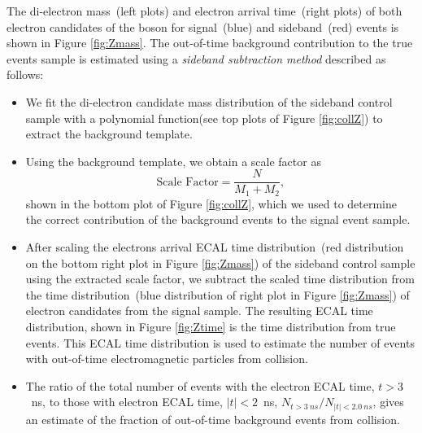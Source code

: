 \vspace{5mm}
The di-electron mass~(left plots) and electron arrival time~(right plots) of both electron candidates of the \PZ boson for signal~(blue) and sideband~(red) events is shown in Figure \ref{fig:Zmass}. The out-of-time background contribution to the true \PZ events sample is estimated using a \textit{sideband subtraction method} described as follows:
\begin{itemize}
\item We fit the di-electron candidate mass distribution of the sideband control sample with a polynomial function(see top plots of Figure  \ref{fig:collZ}) to extract the background template.
\item Using the background template, we obtain a scale factor as 
\begin{equation}
\mbox{Scale Factor} = \frac{N}{M_{1} + M_{2}},
\end{equation}
shown in the bottom plot of Figure \ref{fig:collZ}, which we used to determine the correct contribution of the background events to the signal event sample.
\item After scaling the electrons arrival ECAL time distribution~(red distribution on the bottom right plot in Figure \ref{fig:Zmass}) of the sideband control sample using the extracted scale factor, we subtract the scaled time distribution from the time distribution~(blue distribution of right plot in Figure \ref{fig:Zmass}) of \PZ electron candidates from the signal sample. The resulting ECAL time distribution, shown in Figure \ref{fig:Ztime} is the time distribution from true \PZ events. This ECAL time distribution is used to estimate the number of events with out-of-time electromagnetic particles from collision.
\item The ratio of the total number of events with the electron ECAL time, $t > 3$~ns, to those with electron ECAL time, $|t| < 2$~ns, \ie $ N_{t > 3~ns}/ N_{|t| < 2.0~ns}$, gives an estimate of the fraction of out-of-time background events from collision. 
\end{itemize}  

